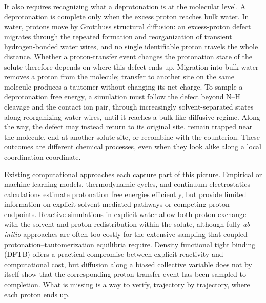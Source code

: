 It also requires recognizing what a deprotonation is at the molecular level.
A deprotonation is complete only when the excess proton reaches bulk water.
In water, protons move by Grotthuss structural diffusion: an excess-proton defect migrates through the repeated formation and reorganization of transient hydrogen-bonded water wires, and no single identifiable proton travels the whole distance.\cite{agmonGrotthussMechanism1995,agmonProtonsHydroxideIons2016,cukiermanTuGrotthussOther2006,hassanaliProtonTransferWater2013,miyakeGrotthussMechanismsProton2016,popovSearchGrotthussMechanism2023}
Whether a proton-transfer event changes the protonation state of the solute therefore depends on where this defect ends up.
Migration into bulk water removes a proton from the molecule; transfer to another site on the same molecule produces a tautomer without changing its net charge.
To sample a deprotonation free energy, a simulation must follow the defect beyond N--H cleavage and the contact ion pair, through increasingly solvent-separated states along reorganizing water wires, until it reaches a bulk-like diffusive regime.
Along the way, the defect may instead return to its original site, remain trapped near the molecule, end at another solute site, or recombine with the counterion.
These outcomes are different chemical processes, even when they look alike along a local coordination coordinate.

Existing computational approaches each capture part of this picture.
Empirical or machine-learning models, thermodynamic cycles, and continuum-electrostatics calculations estimate protonation free energies efficiently, but provide limited information on explicit solvent-mediated pathways or competing proton endpoints.\cite{navoComputerPredictionKa2021,pliegoThermodynamicCyclesCalculation2003,casasnovasTheoreticalKaCalculations2014}
Reactive simulations in explicit water allow both proton exchange with the solvent and proton redistribution within the solute,\cite{Tummanapelli2014,Tummanapelli2015GSH,Sakti2018} although fully \emph{ab initio} approaches are often too costly for the extensive sampling that coupled protonation--tautomerization equilibria require.\cite{saktiRecentAdvancesQuantummechanical2020,yangUsingMetadynamicsBuild2022}
Density functional tight binding (DFTB) offers a practical compromise between explicit reactivity and computational cost,\cite{gausDensityFunctionalTight2014,spiegelmanDensityfunctionalTightbindingBasic2020} but diffusion along a biased collective variable does not by itself show that the corresponding proton-transfer event has been sampled to completion.\cite{goyalMolecularSimulationWater2014}
What is missing is a way to verify, trajectory by trajectory, where each proton ends up.

